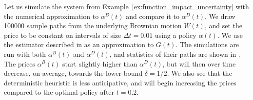 \documentclass[main.tex]{subfiles}
\begin{document}
\begin{example}\label{ex:impact_uncertainty}
  Let us simulate the system from
  Example~\ref{ex:function_impact_uncertainty}
  with the numerical approximation to $\alpha^B(t)$ and compare it to $\alpha^D(t)$.
  We draw \num{100000} sample paths from the underlying Brownian
  motion $W(t)$, and set the price to be constant on intervals of size $\Delta t = 0.01$
  using a policy $\alpha(t)$. We use the estimator described in
   as an approximation to $G(t)$.
  The simulations are run with both $\alpha^B(t)$ and $\alpha^D(t)$, and
  statistics of their paths are shown in .
  The prices $\alpha^B(t)$ start slightly higher than $\alpha^D(t)$, but
  will then over time decrease, on average, towards the lower bound
  $\delta=1/2$. We also see that the deterministic heuristic is less
  anticipative, and will begin increasing the prices compared to the
  optimal policy after $t=0.2$.


\end{example}
\end{document}
